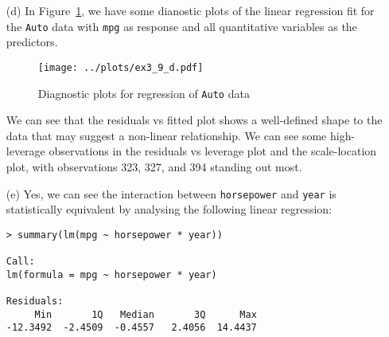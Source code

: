 \begin{itemize}
\begin{verbatim}
Residual standard error: 3.328 on 384 degrees of freedom
Multiple R-squared:  0.8215,    Adjusted R-squared:  0.8182 
F-statistic: 252.4 on 7 and 384 DF,  p-value: < 2.2e-16
        \end{verbatim}\normalsize
        \begin{itemize}
            \item[(i)] Yes, since we have several predictors with low $p$-values
                and/or low standard error relative to the estimate.
            \item[(ii)] The predictors with the most statistically significant
                relationship to the response appear to be \verb|displacement|, 
                \verb|weight|, \verb|year|, and \verb|origin|.
            \item[(iii)] The coefficient of the \verb|year| variable is given
                by 0.750773, suggesting that an increase of 1 year in the model's 
                date of manufacture is associated with an increase of 0.750773 miles
                per gallon in fuel consumption by the vehicle.
        \end{itemize}
    \item[(d)] In Figure~\ref{fig3_9diag}, we have some dianostic plots of the linear 
        regression fit for the \verb|Auto| data with \verb|mpg| as response and all 
        quantitative variables as the predictors.
        \begin{figure}[!ht]
            \texttt{[image: ../plots/ex3\_9\_d.pdf]}
            \caption{Diagnostic plots for regression of \texttt{Auto} data \label{fig3_9diag}}
        \end{figure}
        We can see that the residuals vs fitted plot shows a well-defined shape to the
        data that may suggest a non-linear relationship. We can see some high-leverage
        observations in the residuals vs leverage plot and the scale-location plot, 
        with observations 323, 327, and 394 standing out most.
    \item[(e)] Yes, we can see the interaction between \verb|horsepower| and \verb|year|
        is statistically equivalent by analysing the following linear regression:
        \scriptsize\begin{verbatim}
> summary(lm(mpg ~ horsepower * year))

Call:
lm(formula = mpg ~ horsepower * year)

Residuals:
     Min       1Q   Median       3Q      Max 
-12.3492  -2.4509  -0.4557   2.4056  14.4437 


\end{verbatim}
\end{itemize}
